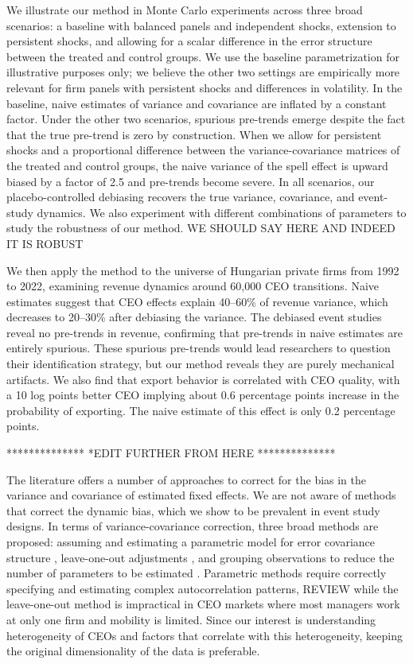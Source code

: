 \documentclass[11pt,a4paper]{article}
\begin{document}
We illustrate our method in Monte Carlo experiments across three broad scenarios: a baseline with balanced panels and independent shocks, extension to persistent shocks, and allowing for a scalar difference in the error structure between the treated and control groups. We use the baseline parametrization for illustrative purposes only; we believe the other two settings are empirically more relevant for firm panels with persistent shocks \citep{Olley1996-wy} and differences in volatility. In the baseline, naive estimates of variance and covariance are inflated by a constant factor. Under the other two scenarios, spurious pre-trends emerge despite the fact that the true pre-trend is zero by construction. When we allow for persistent shocks and a proportional difference between the variance-covariance matrices of the treated and control groups, the naive variance of the spell effect is upward biased by a factor of 2.5 and pre-trends become severe. In all scenarios, our placebo-controlled debiasing recovers the true variance, covariance, and event-study dynamics. We also experiment with different combinations of parameters to study the robustness of our method. WE SHOULD SAY HERE AND INDEED IT IS ROBUST

We then apply the method to the universe of Hungarian private firms from 1992 to 2022, examining revenue dynamics around 60,000 CEO transitions. Naive estimates suggest that CEO effects explain 40--60\% of revenue variance, which decreases to 20--30\% after debiasing the variance. The debiased event studies reveal no pre-trends in revenue, confirming that pre-trends in naive estimates are entirely spurious. These spurious pre-trends would lead researchers to question their identification strategy, but our method reveals they are purely mechanical artifacts. We also find that export behavior is correlated with CEO quality, with a 10 log points better CEO implying about 0.6 percentage points increase in the probability of exporting. The naive estimate of this effect is only 0.2 percentage points.

**************
*EDIT FURTHER FROM HERE
**************



The literature offers a number of approaches to correct for the bias in the variance and covariance of estimated fixed effects. We are not aware of methods that correct the dynamic bias, which we show to be prevalent in event study designs. In terms of variance-covariance correction, three broad methods are proposed: assuming and estimating a parametric model for error covariance structure \citep{andrews2008high,gaure2014correlation,kline2024firm}, leave-one-out adjustments \citep{kline2020leave}, and grouping observations to reduce the number of parameters to be estimated \citep{Bonhomme2019-xi}. Parametric methods require correctly specifying and estimating complex autocorrelation patterns, REVIEW while the leave-one-out method is impractical in CEO markets where most managers work at only one firm and mobility is limited. Since our interest is understanding heterogeneity of CEOs and factors that correlate with this heterogeneity, keeping the original dimensionality of the data is preferable. 
\end{document}
